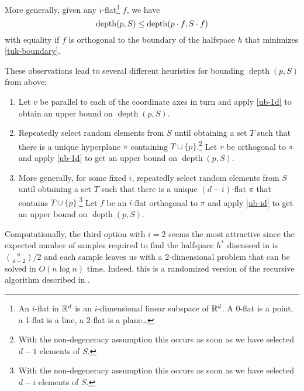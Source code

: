 \documentclass[lotsofwhite,12pt]{patmorin}
\DeclareMathOperator{\td}{depth}
\begin{document}
More generally, given any $i$-flat\footnote{An $i$-flat in $\mathbb{R}^d$ is
an $i$-dimensional linear subspace of $\mathbb{R}^d$. A 0-flat is a point, a
1-flat is a line, a 2-flat is a plane\ldots} $f$, we have
\begin{equation}
      \td(p,S) \le \td(p\cdot f, S\cdot f) \eqlabel{ub-id}
\end{equation}
with equality if $f$ is orthogonal to the boundary of the halfspace $h$
that minimizes \eqref{tuk-boundary}.

These observations lead to several different heuristics for bounding
$\td(p,S)$ from above:

\begin{enumerate}
\item Let $v$ be parallel to each of the coordinate axes in turn and
apply \eqref{ub-1d} to obtain an upper bound on $\td(p,S)$.

\item Repeatedly select random elements from $S$ until obtaining a set
$T$ such that there is a unique hyperplane $\pi$ containing
$T\cup\{p\}$.\footnote{With the non-degeneracy assumption this occurs
as soon as we have selected $d-1$ elements of $S$.} Let $v$ be
orthogonal to $\pi$ and apply \eqref{ub-1d} to get an upper bound on
$\td(p,S)$.

\item More generally, for some fixed $i$, repeatedly select random
elements from $S$ until obtaining a set $T$ such that there is a
unique $(d-i)$-flat $\pi$  that contains $T\cup\{p\}$.\footnote{With
the non-degeneracy assumption this occurs as soon as we have selected
$d-i$ elements of $S$.}  Let $f$ be an
$i$-flat orthogonal to $\pi$ and apply \eqref{ub-id} to get an upper
bound on $\td(p,S)$.

\end{enumerate}


Computationally, the third option with $i=2$ seems the most attractive
since the expected number of samples required to find the halfspace
$h^*$ discussed in  is ${n\choose d-2}/2$ and each
sample leaves us with a 2-dimensional problem that can be solved in
$O(n\log n)$ time.  Indeed, this is a randomized version of the
recursive algorithm described in .
\end{document}
